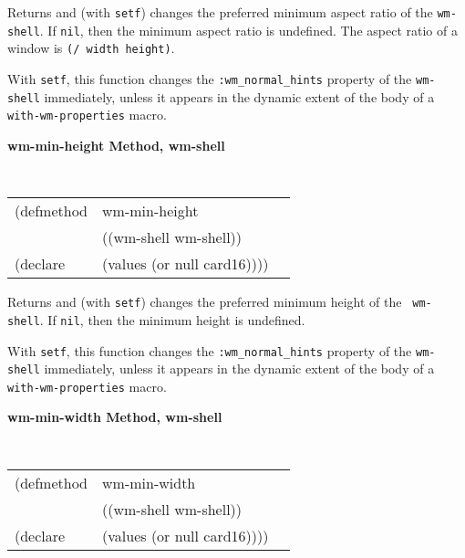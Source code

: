 \documentclass[twoside]{book}
\begin{document}
\begin{sloppy}
{\begin{flushright}
{}\end{flushright}}

\begin{flushright} \parbox[t]{6.125in}{
Returns and (with {\tt setf}) changes the preferred minimum aspect ratio of the
{\tt wm-shell}. If {\tt nil}, then the minimum aspect ratio is undefined. The aspect ratio of a
window is {\tt (/ width height)}. 

With {\tt setf}, this function changes the {\tt :wm\_normal\_hints} property of
the {\tt wm-shell} immediately, unless it appears in the dynamic extent of the
body of a {\tt with-wm-properties} macro.

}\end{flushright}


{\samepage
{\large {\bf wm-min-height \hfill Method, wm-shell}}
\begin{flushright} \parbox[t]{6.125in}{
\tt
\begin{tabular}{lll}
\raggedright
(defmethod & wm-min-height & \\
           & ((wm-shell  wm-shell)) \\
(declare   & (values (or null card16))))
\end{tabular}
\rm

}\end{flushright}}

\begin{flushright} \parbox[t]{6.125in}{
Returns and (with {\tt setf}) changes the preferred minimum height of the {\tt
wm-shell}. If {\tt nil}, then the minimum height is undefined. 

With {\tt setf}, this function changes the {\tt :wm\_normal\_hints} property of
the {\tt wm-shell} immediately, unless it appears in the dynamic extent of the
body of a {\tt with-wm-properties} macro.

}\end{flushright}

{\samepage
{\large {\bf wm-min-width \hfill Method, wm-shell}}
\begin{flushright} \parbox[t]{6.125in}{
\tt
\begin{tabular}{lll}
\raggedright
(defmethod & wm-min-width & \\
           & ((wm-shell  wm-shell)) \\
(declare   & (values (or null card16))))
\end{tabular}
\rm

}
\end{flushright}}
\end{sloppy}
\end{document}
